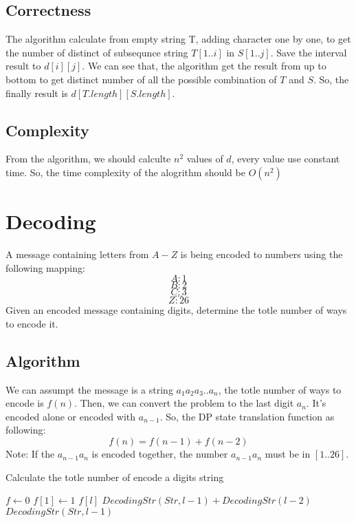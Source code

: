 \documentclass{article}
\numberwithin{equation}{section}
\begin{document}
	\subsection{Correctness}
	The algorithm calculate from empty string T, adding character one by one, to get the number of distinct of 
	subsequnce string $T[1..i]$ in $S[1..j]$. Save the interval result to $d[i][j]$. We can see that, the algorithm
	get the result from up to bottom to get distinct number of all the possible combination of $T$ and $S$. So, the finally result is $d[T.length][S.length]$.
	\subsection{Complexity}	
	From the algorithm, we should calculte $n^2$ values of $d$, every value use constant time. So, the time complexity of the alogrithm should be $O(n^2)$



%
%
\section{Decoding}
	A message containing letters from $A-Z$ is being encoded to numbers using the following mapping:\\
	$$A:1$$ $$B:2$$ $$C:3$$ $$...$$ $$Z:26$$ 
	Given an encoded message containing digits, determine the totle number of ways to encode it.
	\subsection{Algorithm}
	We can assumpt the message is a string $a_1a_2a_3..a_n$, the totle number of ways to encode is $f(n)$. Then, we can convert the problem to the last digit $a_{n}$. It's encoded alone or encoded with $a_{n-1}$. So, the DP state translation function as following:
		$$f(n) = f(n-1) + f(n-2) $$
	Note: If the $a_{n-1}a_n$ is encoded together, the number $a_{n-1}a_n$ must be in $[1..26]$.
	\begin{algorithm}
		\caption{Calculate the totle number of encode a digits string}
		\label{alg3}
		\begin{algorithmic}[1]
		\REQUIRE $f \gets {0}$
		\REQUIRE $f[1] \gets 1$
		  
				\RETURN $f[l]$
			\ENDIF
				\RETURN $DecodingStr(Str,l-1) + DecodingStr(l-2)$
			\ELSE
				\RETURN $DecodingStr(Str,l-1)$
			\ENDIF
		\EndFunction
		 \end{algorithmic}
	\end{algorithm}
\end{document}
